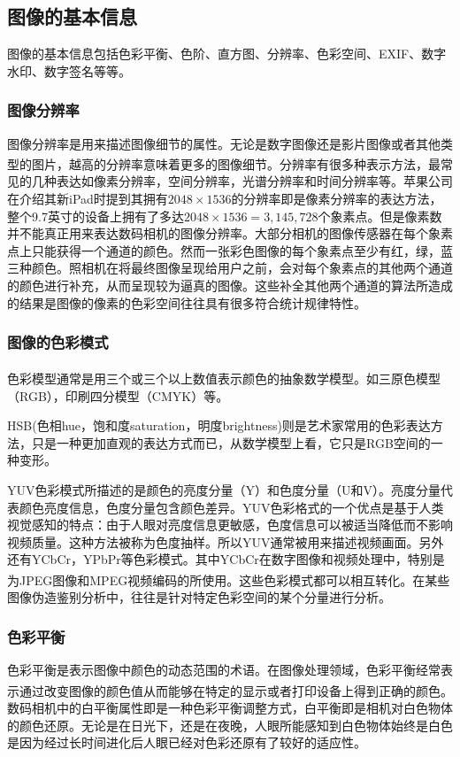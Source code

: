 \documentclass[a4paper, 10pt, notitlepage]{report}
\newcommand{\supercite}[1]{\textsuperscript{\cite{#1}}}
\begin{document}
		\subsection{图像的基本信息}
			图像的基本信息包括色彩平衡、色阶、直方图、分辨率、色彩空间、EXIF、数字水印、数字签名等等。
			
			\subsubsection{图像分辨率}
				图像分辨率是用来描述图像细节的属性。无论是数字图像还是影片图像或者其他类型的图片，越高的分辨率意味着更多的图像细节。分辨率有很多种表示方法\supercite{pouliot2002automated}，最常见的几种表达如像素分辨率，空间分辨率，光谱分辨率和时间分辨率等。苹果公司在介绍其新iPad时提到其拥有$2048\times1536$的分辨率即是像素分辨率的表达方法，整个9.7英寸的设备上拥有了多达$2048 \times 1536 = 3,145,728$个象素点。但是像素数并不能真正用来表达数码相机的图像分辨率。大部分相机的图像传感器在每个象素点上只能获得一个通道的颜色。然而一张彩色图像的每个象素点至少有红，绿，蓝三种颜色。照相机在将最终图像呈现给用户之前，会对每个象素点的其他两个通道的颜色进行补充，从而呈现较为逼真的图像。这些补全其他两个通道的算法所造成的结果是图像的像素的色彩空间往往具有很多符合统计规律特性。

			\subsubsection{图像的色彩模式}
				色彩模型通常是用三个或三个以上数值表示颜色的抽象数学模型\supercite{stokes1996standard}。如三原色模型（RGB），印刷四分模型（CMYK）等。

				HSB(色相hue，饱和度saturation，明度brightness)则是艺术家常用的色彩表达方法，只是一种更加直观的表达方式而已，从数学模型上看，它只是RGB空间的一种变形。

				YUV色彩模式所描述的是颜色的亮度分量（Y）和色度分量（U和V）。亮度分量代表颜色亮度信息，色度分量包含颜色差异。YUV色彩格式的一个优点是基于人类视觉感知的特点：由于人眼对亮度信息更敏感，色度信息可以被适当降低而不影响视频质量。这种方法被称为色度抽样。所以YUV通常被用来描述视频画面。另外还有YCbCr，YPbPr等色彩模式。其中YCbCr在数字图像和视频处理中，特别是为JPEG图像和MPEG视频编码的所使用。这些色彩模式都可以相互转化\supercite{yang2007fast}。在某些图像伪造鉴别分析中，往往是针对特定色彩空间的某个分量进行分析。

			\subsubsection{色彩平衡}
				色彩平衡是表示图像中颜色的动态范围的术语。在图像处理领域，色彩平衡经常表示通过改变图像的颜色值从而能够在特定的显示或者打印设备上得到正确的颜色\supercite{郑建铧2003利用色彩直方图特征进行偏色图象的自动检测和校正}。数码相机中的白平衡属性即是一种色彩平衡调整方式，白平衡即是相机对白色物体的颜色还原。无论是在日光下，还是在夜晚，人眼所能感知到白色物体始终是白色是因为经过长时间进化后人眼已经对色彩还原有了较好的适应性。
\end{document}

